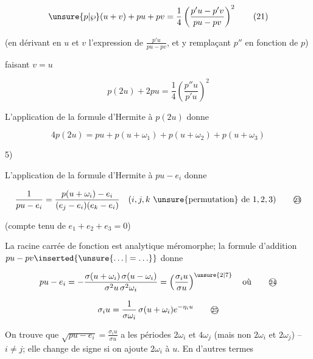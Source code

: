 \[
\unsure{p|\wp}(u+v)+pu+pv=\frac14\left(\frac{p'u-p'v}{pu-pv}\right)^2
\tag*{(21)}
\]

(en dérivant en $u$ et $v$ l'expression de $\frac{p'u}{pu-pv}$, et y remplaçant $p''$ en fonction de $p$)

faisant $v=u$

\[
p(2u)+2pu=\frac14\left(\frac{p''u}{p'u}\right)^2
\tag*{(21 bis)}
\]

L'application de la formule d'Hermite à $p(2u)$ donne

\[
4p(2u)=pu+p(u+\omega_1)+p(u+\omega_2)+p(u+\omega_3)
\tag*{(22)}
\]

5) 

L'application de la formule d'Hermite à $pu-e_i$ donne

\[
\frac{1}{pu-e_i}=\frac{p(u+\omega_i)-e_i}{(e_j-e_i)(e_k-e_i)}
\quad(i,j,k\ \text{\unsure{permutation} de }1,2,3)
\tag*{\textcircled{\scriptsize 23}}
\]

(compte tenu de $e_1+e_2+e_3=0$)

La racine carrée de  fonction est analytique méromorphe; la formule d'addition $pu-pv\inserted{\unsure{\ldots|=\ldots}}$ donne

\[
pu-e_i=-\frac{\sigma(u+\omega_i)\,\sigma(u-\omega_i)}{\sigma^2u\,\sigma^2\omega_i}
=\left(\frac{\sigma_i u}{\sigma u}\right)^{\unsure{2|7}}\quad\text{où}
\tag*{\textcircled{\scriptsize 24}}
\]

\[
\sigma_i u=\frac{1}{\sigma\omega_i}\,\sigma(u+\omega_i)e^{-\eta_i u}
\tag*{\textcircled{\scriptsize 25}}
\]

On trouve que $\sqrt{pu-e_i}=\frac{\sigma_i u}{\sigma u}$ a les périodes $2\omega_i$ et $4\omega_j$ (mais non $2\omega_i$ et $2\omega_j$) -- $i\ne j$; elle change de signe si on ajoute $2\omega_i$ à $u$. En d'autres termes

